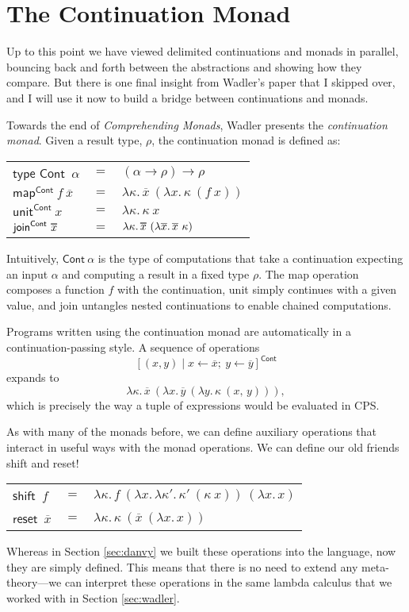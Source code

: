 \documentclass[acmsmall, nonacm, screen]{acmart}
\newcommand\doverline[1]{%
  \setbox0=\hbox{$\overline{#1}$}%
  \ht0=\dimexpr\ht0-.30ex\relax%
  \overline{\copy0}%
}
\newcommand{\lambdaE}[2]{\lambda #1.\, #2}
\newcommand{\map}[3]{\textsf{map}^{\textsf{#1}}~#2~#3}
\newcommand{\unit}[2]{\textsf{unit}^{\textsf{#1}}~#2}
\newcommand{\join}[2]{\textsf{join}^{\textsf{#1}}~#2}
\begin{document}
\section{The Continuation Monad} \label{sec:contmonad}
Up to this point we have viewed delimited continuations and monads in parallel, bouncing back and
forth between the abstractions and showing how they compare. But there is one final insight from
Wadler's paper that I skipped over, and I will use it now to build a bridge between continuations
and monads.

Towards the end of {\em Comprehending Monads}, Wadler presents the {\em continuation monad}.
Given a result type, $\rho$, the continuation monad is defined as:
\begin{center}
  \begin{tabular}{lll}
    $\textsf{type Cont}$~$\alpha$ & $=$ & $(\alpha \to \rho) \to \rho$ \\
    $\map{Cont}{f}{\overline{x}}$ & $=$ & $\lambdaE{\kappa}{\overline{x}~(\lambdaE{x}{\kappa~(f~x)})}$ \\
    $\unit{Cont}{x}$ & $=$ & $\lambdaE{\kappa}{\kappa~x}$ \\
    $\join{Cont}{\doverline{x}}$ & $=$ &
      $\lambdaE{\kappa}{\doverline{x}~(\lambdaE{\overline{x}}{\overline{x}~\kappa})}$
  \end{tabular}
\end{center}
Intuitively, $\textsf{Cont}~\alpha$ is the type of computations that take a continuation
expecting an input $\alpha$ and computing a result in a fixed type $\rho$. The \textsf{map}
operation composes a function $f$ with the continuation, \textsf{unit} simply continues with a
given value, and \textsf{join} untangles nested continuations to enable chained computations.

Programs written using the continuation monad are automatically in a continuation-passing style.
A sequence of operations
\[ [(x, y) \mid x \leftarrow \overline{x};\ y \leftarrow \overline{y}]^{\textsf{Cont}} \]
expands to
\[ \lambdaE{\kappa}{\overline{x}~(\lambdaE{x}{\overline{y}~(\lambdaE{y}{\kappa~(x,\, y)})})}, \]
which is precisely the way a tuple of expressions would be evaluated in CPS.

As with many of the monads before, we can define auxiliary operations that interact in useful ways
with the monad operations. We can define our old friends \textsf{shift} and \textsf{reset}!
\begin{center}
  \begin{tabular}{lll}
    $\textsf{shift}$~$f$ & $=$ & $\lambdaE{\kappa}{f~(\lambdaE{x}{\lambdaE{\kappa'}{\kappa'~(\kappa~x)}})~(\lambdaE{x}{x})}$ \\
    $\textsf{reset}$~$\overline{x}$ & $=$ & $\lambdaE{\kappa}{\kappa~(\overline{x}~(\lambdaE{x}{x}))}$
  \end{tabular}
\end{center}
Whereas in Section \ref{sec:danvy} we built these operations into the language, now they are
simply defined. This means that there is no need to extend any meta-theory---we can interpret these
operations in the same lambda calculus that we worked with in Section \ref{sec:wadler}.
\end{document}
